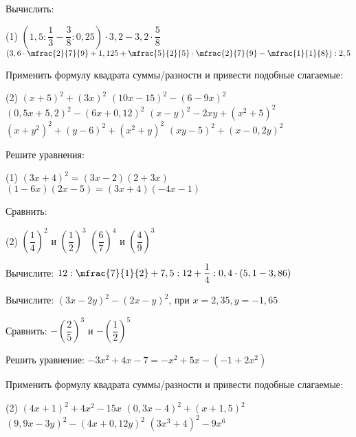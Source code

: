 \begin{class}[number=2]
	\begin{listofex}
		\item Вычислить: 
		\begin{tasks}(1)
			\task \( \left(  1,5 : \dfrac{1}{3} - \dfrac{3}{8} : 0,25 \right) \cdot 3,2 - 3,2 \cdot \dfrac{5}{8} \)
			\task \( \left(  3,6 \cdot \mfrac{2}{7}{9} + 1,125 + \mfrac{5}{2}{5} \cdot  \mfrac{2}{7}{9} - \mfrac{1}{1}{8} \right) : 2,5 \)
		\end{tasks}
		\item Применить формулу квадрата суммы/разности и привести подобные слагаемые:
		\begin{tasks}(2)
			\task \( (x+5)^2+(3x)^2 \)
			\task \( (10x-15)^2-(6-9x)^2 \)
			\task \( (0,5x+5,2)^2-(6x+0,12)^2 \)
			\task \( (x-y)^2-2xy+(x^2+5)^2 \)
			\task \( (x+y^2)^2 + (y-6)^2 + (x^2+y)^2 \)
			\task  \( (xy-5)^2 + (x-0,2y)^2 \)
		\end{tasks}
		\item Решите уравнения: 
		\begin{tasks}(1)
			\task \( (3x+4)^2=(3x-2)(2+3x) \)
			\task \( (1-6x)(2x-5)=(3x+4)(-4x-1) \)
		\end{tasks}
		\item Сравнить: 
		\begin{tasks}(2)
			\task \( \left( \dfrac{1}{4} \right)^2\) и \( \left( \dfrac{1}{2} \right)^3\)
			\task \( \left( \dfrac{6}{7} \right)^4\) и \( \left( \dfrac{4}{9} \right)^3\)
		\end{tasks}
		
	\end{listofex}
\end{class}

\begin{homework}[number=1]
	\begin{listofex}
		\item Вычислите: \(12:\mfrac{7}{1}{2}+7,5:12+\dfrac{1}{4}:0,4\cdot(5,1-3,86)\)
		\item Вычислите: \((3x-2y)^2-(2x-y)^2\), при \(x=2,35, y=-1,65\)
		\item Сравнить: \(- \left( \dfrac{2}{5} \right)^3\) и \(- \left( \dfrac{1}{2} \right)^5\)
		\item Решить уравнение: \quad \( -3x^2+4x-7=-x^2+5x-(-1+2x^2) \)
		\item Применить формулу квадрата суммы/разности и привести подобные слагаемые:
		\begin{tasks}(2)
			\task \( (4x+1)^2+4x^2-15x \)
			\task \( (0,3x-4)^2+(x+1,5)^2 \)
			\task \( (9,9x-3y)^2-(4x+0,12y)^2 \)
			\task \( (3x^3+4)^2-9x^6 \)
		\end{tasks}\
	\end{listofex}
\end{homework}

